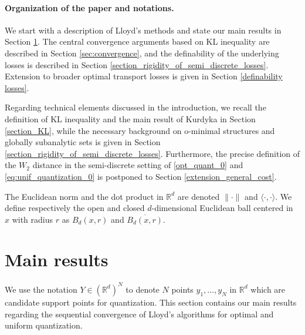 \documentclass[11pt]{article}
\newcommand{\R}{\mathbb R}
\newcommand{\1}{\mathbbm{1}}
\numberwithin{equation}{section}
\begin{document}
\paragraph{Organization of the paper and notations.}
We start with a description of Lloyd's methods and state our main results in Section \ref{sec:mainResults}. The central convergence arguments based on KL inequality are described in Section \ref{sec:convergence}, and the definability of the underlying losses is described in Section \ref{section_rigidity_of_semi_discrete_losses}. Extension to broader optimal transport losses is given in Section \ref{definability losses}.

Regarding technical elements discussed in the introduction, we recall the definition of KL inequality and the main result of Kurdyka in Section \ref{section_KL}, while the necessary background on o-minimal structures and globally subanalytic sets is given in Section \ref{section_rigidity_of_semi_discrete_losses}. Furthermore, the precise definition of the $W_2$ distance in the semi-discrete setting of \eqref{opt_quant_0} and \eqref{eq:unif_quantization_0} is postponed to Section \ref{extension_general_cost}.

The Euclidean norm and the dot product in $\R^d$ are denoted $\|\cdot\|$ and $\langle\cdot , \cdot\rangle$. We define respectively the open and closed $d$-dimensional Euclidean ball centered in $x$ with radius $r$ as $B_{d}(x,r)$ and $\overline{B_{d}(x,r)}$. 


\section{Main results}
\label{sec:mainResults}


We use the notation $Y\in(\R^d)^N$ to denote $N$ points $y_1,\ldots, y_N$ in $\R^d$ which are candidate support points for quantization. This section contains our main results regarding the sequential convergence of Lloyd's algorithms for optimal and uniform quantization.
\end{document}
